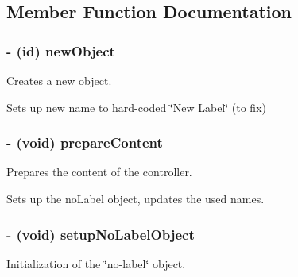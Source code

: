 \subsection{Member Function Documentation}
\hypertarget{interface_z_x_label_controller_08a73cbea0039d0c0e84d41af8bafb7d}{
\subsubsection[{newObject}]{\setlength{\rightskip}{0pt plus 5cm}- (id) newObject }}
\label{interface_z_x_label_controller_08a73cbea0039d0c0e84d41af8bafb7d}


Creates a new object. 

Sets up new name to hard-coded \char`\"{}New Label\char`\"{} (to fix) \hypertarget{interface_z_x_label_controller_4ea2295ba1a5c882725dade2e2bc3e34}{
\subsubsection[{prepareContent}]{\setlength{\rightskip}{0pt plus 5cm}- (void) prepareContent }}
\label{interface_z_x_label_controller_4ea2295ba1a5c882725dade2e2bc3e34}


Prepares the content of the controller. 

Sets up the noLabel object, updates the used names. \hypertarget{interface_z_x_label_controller_30de273ba04ff277ed54ad72762febbf}{
\subsubsection[{setupNoLabelObject}]{\setlength{\rightskip}{0pt plus 5cm}- (void) setupNoLabelObject }}
\label{interface_z_x_label_controller_30de273ba04ff277ed54ad72762febbf}


Initialization of the \char`\"{}no-label\char`\"{} object. 

